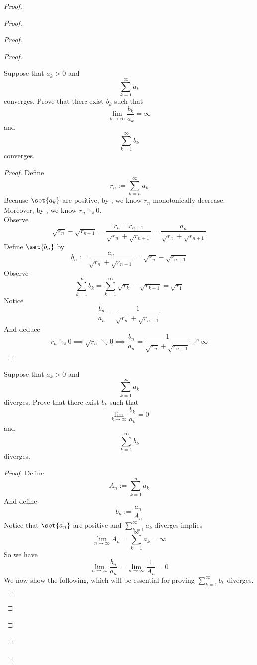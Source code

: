 \documentclass{report}
\begin{document}
\begin{proof}
\begin{proof}
\begin{proof}
\begin{proof}
\begin{question}{}{}
Suppose that \( a_k > 0 \) and 
\[
\sum_{k=1}^{\infty} a_k
\]
converges. Prove that there exist \( b_k \) such that 
\[
\lim_{k \to \infty} \frac{b_k}{a_k} = \infty
\]
and 
\[
\sum_{k=1}^{\infty} b_k
\]
converges.
\end{question}
\begin{proof}
Define
\begin{equation}
r_n:=\sum_{k=n}^\infty a_k
\end{equation}
Because $\set{a_k}$ are positive, by , we know $r_n$ monotonically decrease.\\

Moreover, by , we know $r_n\searrow 0$.\\

Observe
\begin{equation}
\sqrt{r_n} -\sqrt{r_{n+1}}=\frac{r_n-r_{n+1}}{\sqrt{r_n} +\sqrt{r_{n+1}} }=\frac{a_n}{\sqrt{r_n} +\sqrt{r_{n+1}} }
\end{equation}
Define $\set{b_n}$ by
\begin{equation}
b_n:=\frac{a_n}{\sqrt{r_n} +\sqrt{r_{n+1}} }=\sqrt{r_n} -\sqrt{r_{n+1}} 
\end{equation}
Observe
\begin{equation}
\sum_{k=1}^\infty b_k=\sum_{k=1}^\infty \sqrt{r_k} -\sqrt{r_{k+1}}=\sqrt{r_1}  
\end{equation}
Notice 
\begin{equation}
\frac{b_n}{a_n}=\frac{1}{\sqrt{r_n} +\sqrt{r_{n+1}} }
\end{equation}
And deduce
\begin{equation}
r_n\searrow 0\implies \sqrt{r_n} \searrow 0\implies \frac{b_n}{a_n}=\frac{1}{\sqrt{r_n} +\sqrt{r_{n+1}} }\nearrow \infty
\end{equation}
\end{proof}
\begin{question}{}{}
Suppose that \( a_k > 0 \) and 
\[
\sum_{k=1}^{\infty} a_k
\]
diverges. Prove that there exist \( b_k \) such that 
\[
\lim_{k \to \infty} \frac{b_k}{a_k} = 0
\]
and 
\[
\sum_{k=1}^{\infty} b_k
\]
diverges.
\end{question}
\begin{proof}
Define
\begin{equation}
A_n:= \sum_{k=1}^n a_k
\end{equation}
And define
\begin{equation}
b_n:=\frac{a_n}{A_n}
\end{equation}
Notice that $\set{a_n}$ are positive and $\sum_{k=1}^\infty a_k$ diverges implies 
\begin{equation}
\lim_{n\to\infty}A_n=\sum_{k=1}^\infty a_k=\infty
\end{equation}
So we have
\begin{equation}
\lim_{n\to\infty}\frac{b_n}{a_n}=\lim_{n\to\infty}\frac{1}{A_n}=0
\end{equation}
We now show the following, which will be essential for proving $\sum_{k=1}^\infty b_k$ diverges.\\


\end{proof}
\end{proof}
\end{proof}
\end{proof}
\end{proof}
\end{document}
